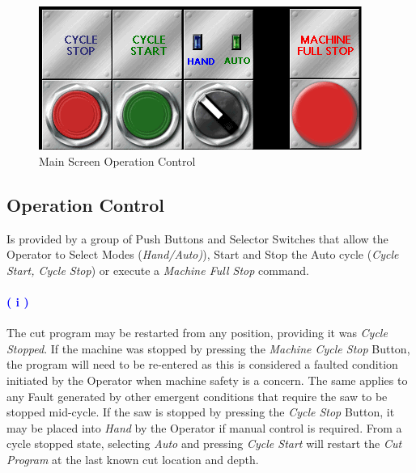 \\
\\
\pagebreak
\begin{figure}
	\centering
	\includegraphics[width=.95\linewidth]{screen-captures/main-screen-opctl}
	\caption{Main Screen Operation Control}
	\label{fig:main-opctl}
\end{figure}
\subsection{Operation Control} Is provided by a group of Push Buttons and Selector Switches that allow the Operator to Select Modes (\textit{Hand/Auto)}), Start and Stop the Auto cycle (\textit{Cycle Start, Cycle Stop}) or execute a \textit{Machine Full Stop} command. 
\paragraph{\textbf{\LARGE \textcolor{blue}{( i )}}} The cut program may be restarted from any position, providing it was \textit{Cycle Stopped}. If the machine was stopped by pressing the \textit{Machine Cycle Stop} Button, the program will need to be re-entered as this is considered a faulted condition initiated by the Operator when machine safety is a concern. The same applies to any Fault generated by other emergent conditions that require the saw to be stopped mid-cycle. If the saw is stopped by pressing the \textit{Cycle Stop} Button, it may be placed into \textit{Hand} by the Operator if manual control is required. From a cycle stopped state, selecting \textit{Auto} and pressing \textit{Cycle Start} will restart the \textit{Cut Program} at the last known cut location and depth.
